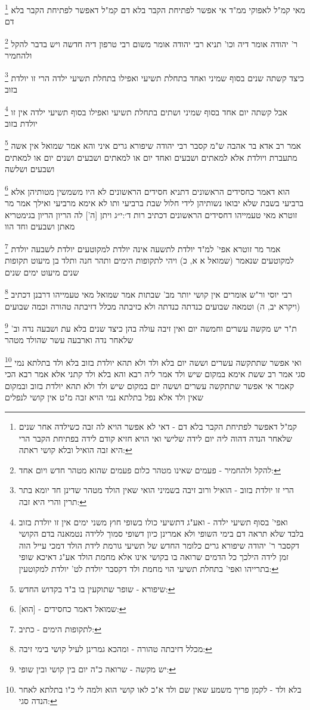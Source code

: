 \documentclass[12pt, openany]{book}
\newcommand{\footnotecomment}[1]{
	\renewcommand\thefootnote{}
	\footnote{#1}}
\newcommand{\commenta}[1]{\footnotecomment{#1}}
\begin{document}
{\commenta{קמ"ל דאפשר לפתיחת הקבר בלא דם - דאי לא אפשר הויא לה זבה כשילדה אחר שנים שלאחר הנדה דהוה ליה יום לידה שלישי ואי הויא חזיא קודם לידה בפתיחת הקבר הרי היא זבה הואיל ובלא קושי ראתה:}
מאי קמ"ל לאפוקי ממ"ד אי אפשר לפתיחת הקבר בלא דם קמ"ל דאפשר לפתיחת הקבר בלא דם
\commenta{להקל ולהחמיר - פעמים שאינו מטהר כלום פעמים שהוא מטהר חדש ויום אחד:}
ר' יהודה אומר דיה וכו' תניא רבי יהודה אומר משום רבי טרפון דיה חדשה ויש בדבר להקל ולהחמיר 
\commenta{הרי זו יולדת בזוב - הואיל ורוב זיבה בשמיני הואי שאין הולד מטהר שדינן חד יומא בתר תרין והרי היא זבה:}
כיצד קשתה שנים בסוף שמיני ואחד בתחלת תשיעי ואפילו בתחלת תשיעי ילדה הרי זו יולדת בזוב
\commenta{ואפי' בסוף תשיעי ילדה - ואע"ג דתשיעי כולו בשופי חוץ משני ימים אין זו יולדת בזוב בלבד שלא תראה דם בימי השופי ולא אמרינן כיון דשופי סמוך ללידה נטמאנה בדם הקושי דקסבר ר' יהודה שיפורא גרים כלומר החדש של תשיעי גורמת לידת הולד דמכי עייל הוה זמן לידה הילכך כל הדמים שרואה בו בקושי אינו אלא מחמת הולד אע"ג דאיכא שופי בתרייהו ואפי' בתחלת תשיעי הוי מחמת ולד דקסבר יולדת לט' יולדת למקוטעין:}
אבל קשתה יום אחד בסוף שמיני ושתים בתחלת תשיעי ואפילו בסוף תשיעי ילדה אין זו יולדת בזוב 
\commenta{שיפורא - שופר שתוקעין בו ב"ד בקדוש החדש:}
אמר רב אדא בר אהבה ש"מ קסבר רבי יהודה שיפורא גרים איני והא אמר שמואל אין אשה מתעברת ויולדת אלא למאתים ושבעים ואחד יום או למאתים ושבעים ושנים יום או למאתים ושבעים ושלשה 
\commenta{[הוא] - שמואל דאמר כחסידים:}
הוא דאמר כחסידים הראשונים דתניא חסידים הראשונים לא היו משמשין מטותיהן אלא ברביעי בשבת שלא יבואו נשותיהן
לידי חלול שבת ברביעי ותו לא אימא מרביעי ואילך 
אמר מר זוטרא מאי טעמייהו דחסידים הראשונים דכתיב {רות ד׳:י״ג } ויתן [ה'] לה הריון הריון בגימטריא מאתן ושבעים וחד הוו 
\commenta{לתקופות הימים - כתיב:}
אמר מר זוטרא אפי' למ"ד יולדת לתשעה אינה יולדת למקוטעים יולדת לשבעה יולדת למקוטעים שנאמר (שמואל א א, כ) ויהי לתקופות הימים ותהר חנה ותלד בן מיעוט תקופות שנים מיעוט ימים שנים
\commenta{מכלל דזיבתה טהורה - ומהכא גמרינן לעיל קושי בימי זיבה:}
רבי יוסי ור"ש אומרים אין קושי יותר מב' שבתות אמר שמואל מאי טעמייהו דרבנן דכתיב (ויקרא יב, ה) וטמאה שבועים כנדתה כנדתה ולא כזיבתה מכלל דזיבתה טהורה וכמה שבועים 
\commenta{יש מקשה - שרואה כ"ה יום בין קושי ובין שופי:}
ת"ר יש מקשה עשרים וחמשה יום ואין זיבה עולה בהן כיצד שנים בלא עת ושבעה נדה וב' שלאחר נדה וארבעה עשר שהולד מטהר 
\commenta{בלא ולד - לקמן פריך משמע שאין שם ולד א"כ לאו קושי הוא ולמה לי כ"ו בתלתא לאחר הנדה סגי:}
ואי אפשר שתתקשה עשרים וששה יום בלא ולד ולא תהא יולדת בזוב 
בלא ולד בתלתא נמי סגי אמר רב ששת אימא במקום שיש ולד אמר ליה רבא והא בלא ולד קתני 
אלא אמר רבא הכי קאמר אי אפשר שתתקשה עשרים וששה יום במקום שיש ולד ולא תהא יולדת בזוב ובמקום שאין ולד אלא נפל בתלתא נמי הויא זבה מ"ט אין קושי לנפלים
}
\end{document}
